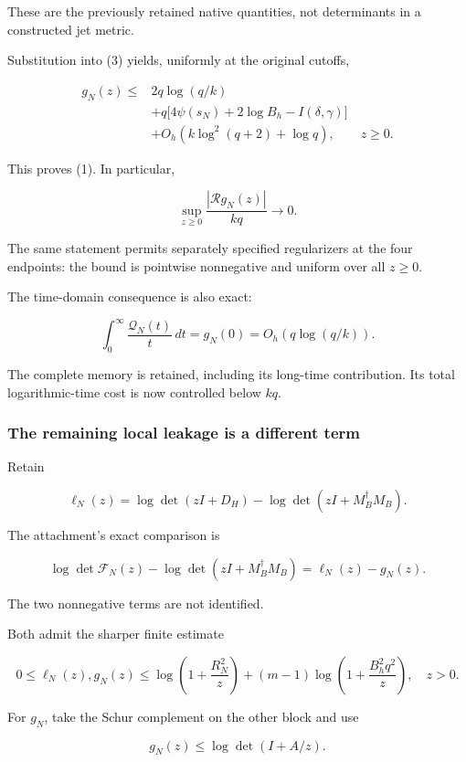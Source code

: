 \documentclass[11pt]{article}
\begin{document}
These are the previously retained native quantities, not determinants in a constructed jet metric.

Substitution into (3) yields, uniformly at the original cutoffs,

\[
\boxed{
\begin{aligned}
g_N(z)\le{}&
2q\log(q/k)\\
&+q\bigl[4\psi(s_N)+2\log B_h-I(\delta,\gamma)\bigr]\\
&+O_h(k\log^2(q+2)+\log q),
\qquad z\ge0.
\end{aligned}
}
\tag{4}
\]

This proves (1). In particular,

\[
\boxed{
\sup_{z\ge0}\frac{|\mathcal Rg_N(z)|}{kq}\longrightarrow0.
}
\tag{5}
\]

The same statement permits separately specified regularizers at the four endpoints: the bound is pointwise nonnegative and uniform over all \(z\ge0\).

The time-domain consequence is also exact:

\[
\boxed{
\int_0^\infty\frac{\mathcal Q_N(t)}t\,dt
=g_N(0)
=O_h(q\log(q/k)).
}
\tag{6}
\]

The complete memory is retained, including its long-time contribution. Its total logarithmic-time cost is now controlled below \(kq\).

\subsubsection{The remaining local leakage is a different term}\label{the-remaining-local-leakage-is-a-different-term}

Retain

\[
\ell_N(z)
=\log\det(zI+D_H)
-\log\det(zI+M_B^\dagger M_B).
\]

The attachment's exact comparison is

\[
\log\det\mathcal F_N(z)
-\log\det(zI+M_B^\dagger M_B)
=\ell_N(z)-g_N(z).
\tag{7}
\]

The two nonnegative terms are not identified.

Both admit the sharper finite estimate

\[
\boxed{
0\le \ell_N(z),g_N(z)
\le
\log\!\left(1+\frac{R_N^2}{z}\right)
+(m-1)\log\!\left(1+\frac{B_h^2q^2}{z}\right),
\quad z>0.
}
\tag{8}
\]

For \(g_N\), take the Schur complement on the other block and use

\[
g_N(z)\le\log\det(I+A/z).
\]
\end{document}
